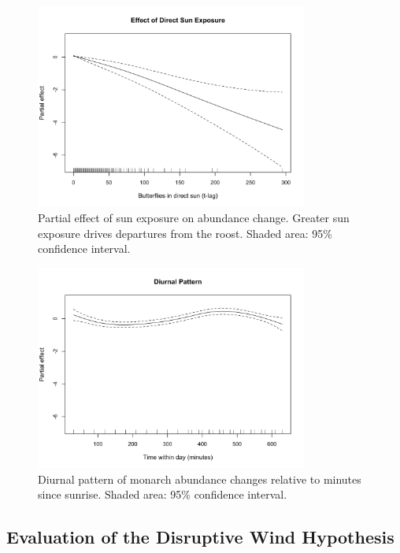 \begin{figure}[htbp]
\centering
\includegraphics[width=0.8\textwidth]{supplemental/results/thesis_exports/figures/effect_sun_exposure.png}
\caption{Partial effect of sun exposure on abundance change. Greater sun exposure drives departures from the roost. Shaded area: 95\% confidence interval.}\label{fig:effect_sun}
\end{figure}

\begin{figure}[htbp]
\centering
\includegraphics[width=0.8\textwidth]{supplemental/results/thesis_exports/figures/effect_diurnal_pattern.png}
\caption{Diurnal pattern of monarch abundance changes relative to minutes since sunrise. Shaded area: 95\% confidence interval.}\label{fig:effect_diurnal}
\end{figure}

\subsection{Evaluation of the Disruptive Wind Hypothesis}

